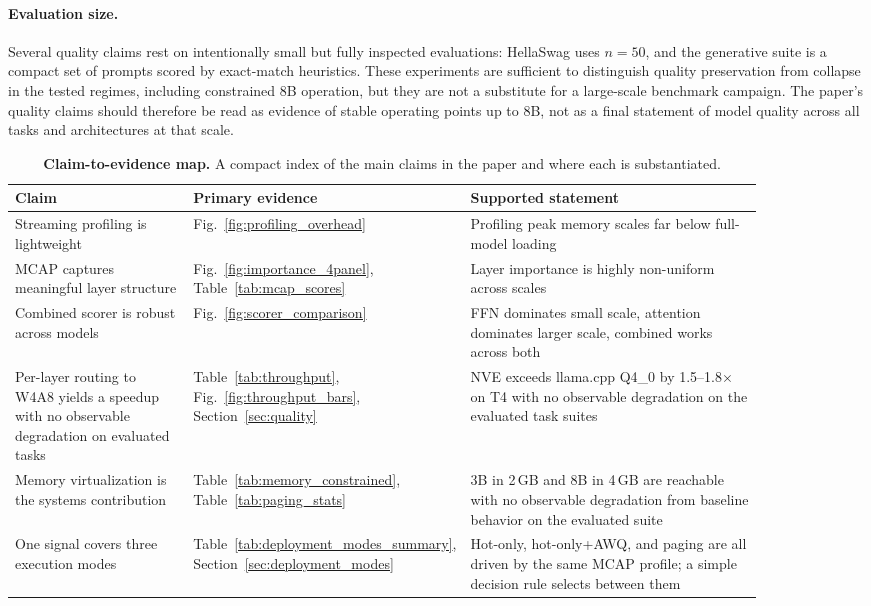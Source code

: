 \documentclass{article}
\begin{document}
\paragraph{Evaluation size.} Several quality claims rest on intentionally
small but fully inspected evaluations: HellaSwag uses $n=50$, and the
generative suite is a compact set of prompts scored by exact-match
heuristics. These experiments are sufficient to distinguish quality
preservation from collapse in the tested regimes, including constrained 8B
operation, but they are not a substitute for a large-scale benchmark
campaign. The paper's quality claims should therefore be read as evidence of
stable operating points up to 8B, not as a final statement of model quality
across all tasks and architectures at that scale.

\begin{table}[H]
\centering
\caption{\textbf{Claim-to-evidence map.} A compact index of the main claims
in the paper and where each is substantiated.}
\label{tab:claim_map}
\small
\begin{tabular}{p{0.25\linewidth}p{0.2\linewidth}p{0.42\linewidth}}
\toprule
Claim & Primary evidence & Supported statement \\
\midrule
Streaming profiling is lightweight & Fig.~\ref{fig:profiling_overhead} & Profiling peak memory scales far below full-model loading \\
MCAP captures meaningful layer structure & Fig.~\ref{fig:importance_4panel}, Table~\ref{tab:mcap_scores} & Layer importance is highly non-uniform across scales \\
Combined scorer is robust across models & Fig.~\ref{fig:scorer_comparison} & FFN dominates small scale, attention dominates larger scale, combined works across both \\
Per-layer routing to W4A8 yields a speedup with no observable degradation on evaluated tasks & Table~\ref{tab:throughput}, Fig.~\ref{fig:throughput_bars}, Section~\ref{sec:quality} & NVE exceeds llama.cpp Q4\_0 by 1.5--1.8$\times$ on T4 with no observable degradation on the evaluated task suites \\
Memory virtualization is the systems contribution & Table~\ref{tab:memory_constrained}, Table~\ref{tab:paging_stats} & 3B in 2\,GB and 8B in 4\,GB are reachable with no observable degradation from baseline behavior on the evaluated suite \\
One signal covers three execution modes & Table~\ref{tab:deployment_modes_summary}, Section~\ref{sec:deployment_modes} & Hot-only, hot-only+AWQ, and paging are all driven by the same MCAP profile; a simple decision rule selects between them \\

\end{tabular}
\end{table}
\end{document}
